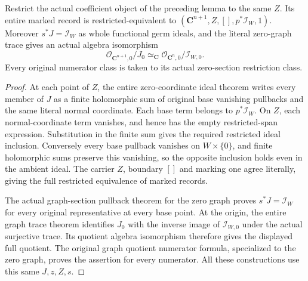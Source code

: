 \begin{lemma}
\label{hir:actual-zero-coordinate-whole-contact-lower-object}
\leanok
Restrict the actual coefficient object of the preceding lemma to the
same $Z$. Its entire marked record is restricted-equivalent to
$(\mathbf C^{n+1},Z,[],p^*\mathcal I_W,1)$. Moreover
$s^*J=\mathcal I_W$ as whole functional germ ideals, and the literal
zero-graph trace gives an actual algebra isomorphism
\[
 \mathcal O_{\mathbf C^{n+1},0}/J_0
       \simeq_{\mathbf C}\mathcal O_{\mathbf C^n,0}/\mathcal I_{W,0}.
\]
Every original numerator class is taken to its actual zero-section
restriction class.
\end{lemma}
\begin{proof}
At each point of $Z$, the entire zero-coordinate ideal theorem writes
every member of $J$ as a finite holomorphic sum of original base
vanishing pullbacks and the same literal normal coordinate. Each
base term belongs to $p^*\mathcal I_W$. On $Z$, each normal-coordinate
term vanishes, and hence has the empty restricted-span expression.
Substitution in the finite sum gives the required restricted ideal
inclusion. Conversely every base pullback vanishes on
$W\times\{0\}$, and finite holomorphic sums preserve this vanishing,
so the opposite inclusion holds even in the ambient ideal. The
carrier $Z$, boundary $[]$ and marking one agree literally, giving
the full restricted equivalence of marked records.

The actual graph-section pullback theorem for the zero graph proves
$s^*J=\mathcal I_W$ for every original representative at every base
point. At the origin, the entire graph trace theorem identifies
$J_0$ with the inverse image of $\mathcal I_{W,0}$ under the actual
surjective trace. Its quotient algebra isomorphism therefore gives
the displayed full quotient. The original graph quotient numerator
formula, specialized to the zero graph, proves the assertion for
every numerator. All these constructions use this same $J,z,Z,s$.
\end{proof}


